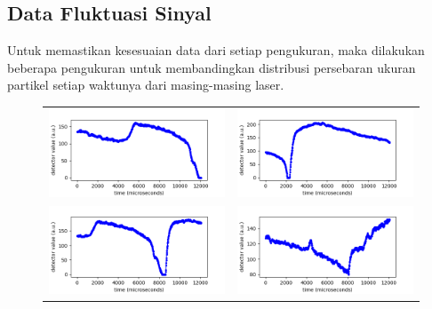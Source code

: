 \subsection{Data Fluktuasi Sinyal}
Untuk memastikan kesesuaian data dari setiap pengukuran, maka
dilakukan beberapa pengukuran untuk membandingkan distribusi
persebaran ukuran partikel setiap waktunya dari masing-masing
laser.

\begin{figure}[H]
  \noindent
  \centering
  \begin{longtable}{p{7cm}p{7cm}}
    \includegraphics[width=8cm]{Images/RawData_Hijau_Data10-01.png}
    &
    \includegraphics[width=8cm]{Images/RawData_Merah_Data9-01.png} \\
    
    \includegraphics[width=8cm]{Images/RawData_Hijau_Data100-01.png}
    &
    \includegraphics[width=8cm]{Images/RawData_Merah_Data99-01.png} \\
   
  \end{longtable}
\end{figure}
